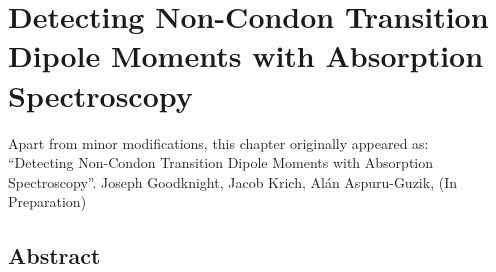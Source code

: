 \chapter{Detecting Non-Condon Transition Dipole Moments with Absorption Spectroscopy}\label{ch:detection}
\thispagestyle{plain}
\vspace{-.5cm}

\noindent Apart from minor modifications, this chapter originally appeared as:\newline\\
\ssp ``Detecting Non-Condon Transition Dipole Moments with Absorption Spectroscopy''.
Joseph Goodknight, Jacob Krich, Al\'an Aspuru-Guzik, (In Preparation)

\section*{Abstract}
    \dsp
    



